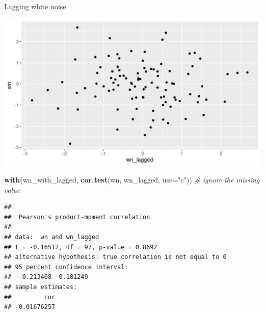 \documentclass[ignorenonframetext,]{beamer}
\newenvironment{Shaded}{\begin{snugshade}}{\end{snugshade}}
\newcommand{\CommentTok}[1]{\textcolor[rgb]{0.56,0.35,0.01}{\textit{#1}}}
\newcommand{\DataTypeTok}[1]{\textcolor[rgb]{0.13,0.29,0.53}{#1}}
\newcommand{\KeywordTok}[1]{\textcolor[rgb]{0.13,0.29,0.53}{\textbf{#1}}}
\newcommand{\NormalTok}[1]{#1}
\newcommand{\OperatorTok}[1]{\textcolor[rgb]{0.81,0.36,0.00}{\textbf{#1}}}
\newcommand{\StringTok}[1]{\textcolor[rgb]{0.31,0.60,0.02}{#1}}
\begin{document}
\begin{frame}[fragile]{Lagging white noise}
\protect\hypertarget{lagging-white-noise}{}

\begin{Shaded}
\end{Shaded}

\includegraphics{figure/unnamed-chunk-530-1.pdf}

\begin{Shaded}
\begin{Highlighting}[]
\KeywordTok{with}\NormalTok{(wn_with_lagged, }\KeywordTok{cor.test}\NormalTok{(wn, wn_lagged, }\DataTypeTok{use=}\StringTok{"c"}\NormalTok{)) }\CommentTok{# ignore the missing value}
\end{Highlighting}
\end{Shaded}

\begin{verbatim}
## 
##  Pearson's product-moment correlation
## 
## data:  wn and wn_lagged
## t = -0.16512, df = 97, p-value = 0.8692
## alternative hypothesis: true correlation is not equal to 0
## 95 percent confidence interval:
##  -0.213468  0.181249
## sample estimates:
##         cor 
## -0.01676257
\end{verbatim}

\end{frame}
\end{document}
